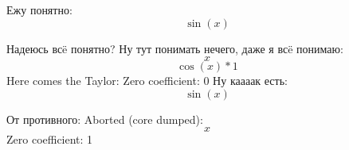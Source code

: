 \documentclass{article}
\begin{document}
Ежу понятно:
\[\sin(x)\]

Надеюсь всë понятно? Ну тут понимать нечего, даже я всë понимаю:
\[x\]
\[\cos(x)*1\]
Here comes the Taylor:
Zero coefficient: 0
Ну каааак есть:
\[\sin(x)\]

От противного:
Aborted (core dumped):
\[x\]
Zero coefficient: 1
\end{document}
